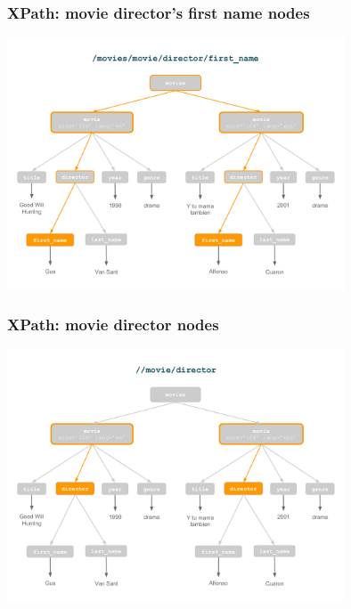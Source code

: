 \documentclass[svgnames]{beamer}
\begin{document}

\begin{frame}
\frametitle{XPath: movie director's first name nodes}
\begin{center}
\includegraphics[width=10cm]{xpath_firstname.pdf}
\end{center}
\end{frame}


\begin{frame}
\frametitle{XPath: movie director nodes}
\begin{center}
\includegraphics[width=10cm]{xpath_director.pdf}
\end{center}
\end{frame}

\end{document}
